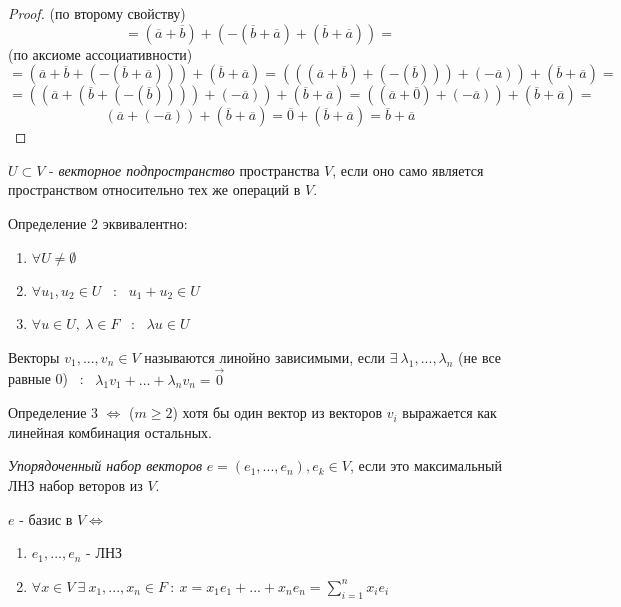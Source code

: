 \begin{definition}
\begin{proof}
      (по второму свойству) 
      $$ = (\overline{a}+\overline{b})+(-(\overline{b}+\overline{a})+(\overline{b}+\overline{a})) = $$ 
      (по аксиоме ассоциативности) 
      $$=(\overline{a}+\overline{b}+(-(\overline{b}+\overline{a})))+(\overline{b}+\overline{a}) = (((\overline{a}+\overline{b})+(-(\overline{b})))+(-\overline{a}))+(\overline{b}+\overline{a}) = $$
      $$= ((\overline{a}+(\overline{b}+(-(\overline{b}))))+(-\overline{a}))+(\overline{b}+\overline{a}) =
      ((\overline{a}+\overline{0})+(-\overline{a}))+(\overline{b}+\overline{a}) =$$
      $$(\overline{a}+(-\overline{a}))+(\overline{b}+\overline{a})
      = \overline{0}+(\overline{b}+\overline{a}) = \overline{b}+\overline{a}$$
    \end{proof} 
  \end{definition}
  \begin{definition}
    $U \subset  V$ - \textit{векторное подпространство} пространства $V$, если оно само является пространством относительно тех же операций в $V$. 
  \end{definition}
  \begin{subtheorem}
    Определение 2 эквивалентно:
    \begin{enumerate}
      \item $\forall U\neq \emptyset $
      \item $\forall u_1, u_2 \in U$ \ : \  $u_1 + u_2 \in U$
      \item $\forall u \in U, \ \lambda \in F$ \ : \ $\lambda u\in U$
    \end{enumerate}
  \end{subtheorem} 
  \begin{definition}
    Векторы $v_1,...,v_n \in V$ называются линойно зависимыми, если $\exists \ \lambda_1,..., \lambda_n$ (не все равные 0) \ : \ $\lambda_1v_1+...+\lambda_nv_n = \vec 0$
  \end{definition} 
  \begin{subtheorem}
    Определение 3 $\Longleftrightarrow $ ($m\geq 2$) хотя бы один вектор из векторов $v_i$ выражается как линейная комбинация остальных. 
  \end{subtheorem}
  \begin{definition}
    \textit{Упорядоченный набор векторов} $e = (e_1,...,e_n), e_k \in V$, если это максимальный ЛНЗ набор веторов из $V$.  
  \end{definition} 
  \begin{subtheorem}
    $e$ - базис в $V \Longleftrightarrow$
    \begin{enumerate}
      \item $e_1,...,e_n$ - ЛНЗ
      \item $\forall x \in V \ \exists \ x_1,...,x_n \in F \ : \ x = x_1e_1+...+x_ne_n = \sum \limits_{i=1}^nx_ie_i $ 
    \end{enumerate}
  \end{subtheorem} 
